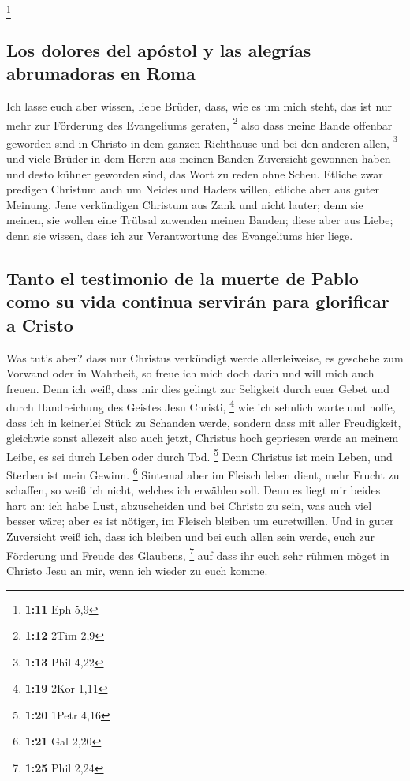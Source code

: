\footnote{\textbf{1:11} Eph 5,9}

\hypertarget{los-dolores-del-apuxf3stol-y-las-alegruxedas-abrumadoras-en-roma}{%
\subsection{Los dolores del apóstol y las alegrías abrumadoras en
Roma}\label{los-dolores-del-apuxf3stol-y-las-alegruxedas-abrumadoras-en-roma}}

 Ich lasse euch aber wissen, liebe Brüder, dass, wie es
um mich steht, das ist nur mehr zur Förderung des Evangeliums geraten,
\footnote{\textbf{1:12} 2Tim 2,9}  also dass meine Bande
offenbar geworden sind in Christo in dem ganzen Richthause und bei den
anderen allen, \footnote{\textbf{1:13} Phil 4,22}  und
viele Brüder in dem Herrn aus meinen Banden Zuversicht gewonnen haben
und desto kühner geworden sind, das Wort zu reden ohne Scheu.
 Etliche zwar predigen Christum auch um Neides und Haders
willen, etliche aber aus guter Meinung.  Jene verkündigen
Christum aus Zank und nicht lauter; denn sie meinen, sie wollen eine
Trübsal zuwenden meinen Banden;  diese aber aus Liebe;
denn sie wissen, dass ich zur Verantwortung des Evangeliums hier liege.

\hypertarget{tanto-el-testimonio-de-la-muerte-de-pablo-como-su-vida-continua-serviruxe1n-para-glorificar-a-cristo}{%
\subsection{Tanto el testimonio de la muerte de Pablo como su vida
continua servirán para glorificar a
Cristo}\label{tanto-el-testimonio-de-la-muerte-de-pablo-como-su-vida-continua-serviruxe1n-para-glorificar-a-cristo}}

 Was tut's aber? dass nur Christus verkündigt werde
allerleiweise, es geschehe zum Vorwand oder in Wahrheit, so freue ich
mich doch darin und will mich auch freuen.  Denn ich
weiß, dass mir dies gelingt zur Seligkeit durch euer Gebet und durch
Handreichung des Geistes Jesu Christi, \footnote{\textbf{1:19} 2Kor 1,11}
 wie ich sehnlich warte und hoffe, dass ich in keinerlei
Stück zu Schanden werde, sondern dass mit aller Freudigkeit, gleichwie
sonst allezeit also auch jetzt, Christus hoch gepriesen werde an meinem
Leibe, es sei durch Leben oder durch Tod. \footnote{\textbf{1:20} 1Petr
  4,16}  Denn Christus ist mein Leben, und Sterben ist
mein Gewinn. \footnote{\textbf{1:21} Gal 2,20}  Sintemal
aber im Fleisch leben dient, mehr Frucht zu schaffen, so weiß ich nicht,
welches ich erwählen soll.  Denn es liegt mir beides hart
an: ich habe Lust, abzuscheiden und bei Christo zu sein, was auch viel
besser wäre;  aber es ist nötiger, im Fleisch bleiben um
euretwillen.  Und in guter Zuversicht weiß ich, dass ich
bleiben und bei euch allen sein werde, euch zur Förderung und Freude des
Glaubens, \footnote{\textbf{1:25} Phil 2,24}  auf dass
ihr euch sehr rühmen möget in Christo Jesu an mir, wenn ich wieder zu
euch komme.

